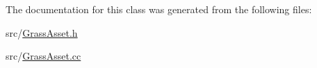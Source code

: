 The documentation for this class was generated from the following files\+:\begin{DoxyCompactItemize}
\item 
src/\hyperlink{GrassAsset_8h}{Grass\+Asset.\+h}\item 
src/\hyperlink{GrassAsset_8cc}{Grass\+Asset.\+cc}\end{DoxyCompactItemize}
